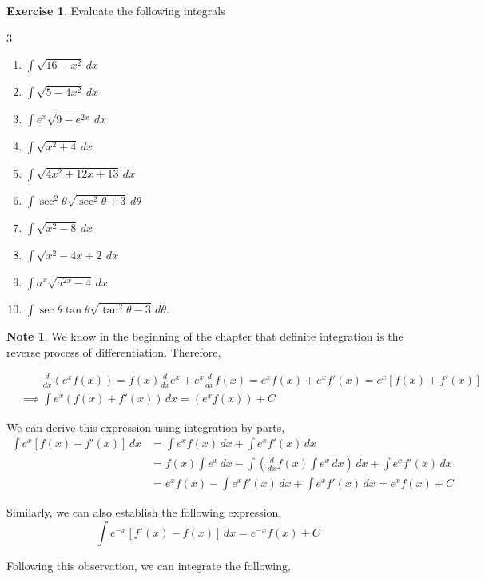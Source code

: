 \documentclass{book}
\theoremstyle{definition}
\newtheorem{exercise}{Exercise}[section]
\newtheorem*{note}{Note}
\begin{document}
\begin{exercise}
Evaluate the following integrals
\begin{multicols}{3}
\begin{enumerate}[label=(\roman*)]
    \item $\displaystyle\int \sqrt{16-x^2}\,dx$
    \item $\displaystyle\int \sqrt{5-4x^2}\,dx$
    \item $\displaystyle\int e^x\sqrt{9-e^{2x}}\,dx$
    \item $\displaystyle\int \sqrt{x^2+4}\,dx$
    \item $\displaystyle\int \sqrt{4x^2+12x+13}\,dx$
    \item $\displaystyle\int \sec^2\theta\sqrt{\sec^2\theta +3}\,d\theta$
    \item $\displaystyle\int \sqrt{x^2-8}\,dx$
    \item $\displaystyle\int \sqrt{x^2-4x+2}\,dx$
    \item $\displaystyle\int a^x\sqrt{a^{2x}-4}\,dx$
    \item $\displaystyle\int \sec\theta\tan\theta\sqrt{\tan^2\theta-3}\,d\theta$.

\end{enumerate}
\end{multicols}    
\end{exercise}

\begin{note}
We know in the beginning of the chapter that definite integration is the reverse process of differentiation. Therefore,

\begin{align*}
 & \qquad \frac{d}{dx}(e^xf(x))=f(x)\frac{d}{dx}e^x+e^x\frac{d}{dx}f(x) = e^xf(x)+e^xf'(x)=e^x\left[f(x)+f'(x)\right] \\ 
 &\implies  \int e^x(f(x)+f'(x))\,dx=(e^xf(x))+C
\end{align*}

We can derive this expression using integration by parts,
\begin{align*}
 \int e^x\left[f(x)+f'(x)\right]\,dx&=\int e^xf(x)\,dx+\int e^xf'(x)\,dx \\
 &= f(x)\int e^x\,dx-\int \left(\frac{d}{dx}f(x)\int e^x\,dx\right)\,dx+\int e^xf'(x)\,dx \\ 
 &= e^xf(x)-\int e^xf'(x)\,dx+\int e^xf'(x)\,dx = e^xf(x)+C
\end{align*}

Similarly, we can also establish the following expression,
\[
\int e^{-x}\left[f'(x)-f(x)\right]\,dx=e^{-x}f(x)+C
\]

\end{note}
\newpage
Following this observation, we can integrate the following,
\end{document}
